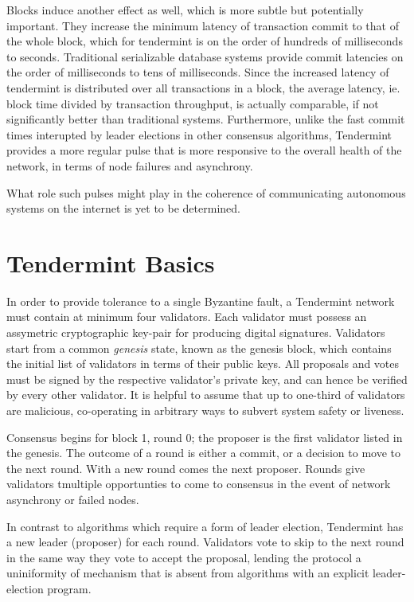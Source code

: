 Blocks induce another effect as well, which is more subtle but potentially important. 
They increase the minimum latency of transaction commit to that of the whole block, which for tendermint is on the order of hundreds of milliseconds to seconds.
Traditional serializable database systems provide commit latencies on the order of milliseconds to tens of milliseconds.
Since the increased latency of tendermint is distributed over all transactions in a block, the average latency, 
ie. block time divided by transaction throughput, is actually comparable, if not significantly better than traditional systems.
Furthermore, unlike the fast commit times interupted by leader elections in other consensus algorithms,
Tendermint provides a more regular pulse that is more responsive to the overall health of the network, in terms of node failures and asynchrony.

What role such pulses might play in the coherence of communicating autonomous systems on the internet is yet to be determined.

\section{Tendermint Basics}

In order to provide tolerance to a single Byzantine fault, a Tendermint network must contain at minimum four validators.
Each validator must possess an assymetric cryptographic key-pair for producing digital signatures.
Validators start from a common \emph{genesis} state, known as the genesis block, which contains the initial list of validators in terms of their public keys.
All proposals and votes must be signed by the respective validator's private key, and can hence be verified by every other validator.
It is helpful to assume that up to one-third of validators are malicious, co-operating in arbitrary ways to subvert system safety or liveness.

Consensus begins for block 1, round 0; the proposer is the first validator listed in the genesis.
The outcome of a round is either a commit, or a decision to move to the next round.
With a new round comes the next proposer.
Rounds give validators tmultiple opportunties to come to consensus in the event of network asynchrony or failed nodes.

In contrast to algorithms which require a form of leader election, Tendermint has a new leader (proposer) for each round.
Validators vote to skip to the next round in the same way they vote to accept the proposal,
lending the protocol a uniniformity of mechanism that is absent from algorithms with an explicit leader-election program.

